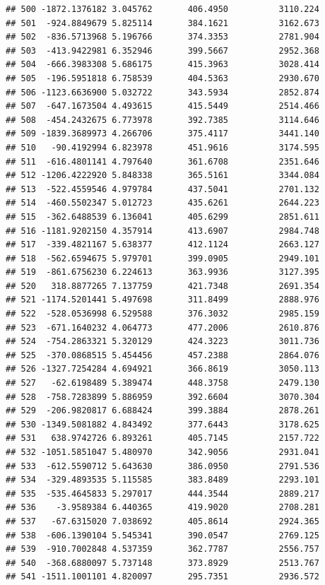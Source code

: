 \documentclass[
]{article}
\begin{document}
\begin{verbatim}
## 500 -1872.1376182 3.045762       406.4950          3110.224
## 501  -924.8849679 5.825114       384.1621          3162.673
## 502  -836.5713968 5.196766       374.3353          2781.904
## 503  -413.9422981 6.352946       399.5667          2952.368
## 504  -666.3983308 5.686175       415.3963          3028.414
## 505  -196.5951818 6.758539       404.5363          2930.670
## 506 -1123.6636900 5.032722       343.5934          2852.874
## 507  -647.1673504 4.493615       415.5449          2514.466
## 508  -454.2432675 6.773978       392.7385          3114.646
## 509 -1839.3689973 4.266706       375.4117          3441.140
## 510   -90.4192994 6.823978       451.9616          3174.595
## 511  -616.4801141 4.797640       361.6708          2351.646
## 512 -1206.4222920 5.848338       365.5161          3344.084
## 513  -522.4559546 4.979784       437.5041          2701.132
## 514  -460.5502347 5.012723       435.6261          2644.223
## 515  -362.6488539 6.136041       405.6299          2851.611
## 516 -1181.9202150 4.357914       413.6907          2984.748
## 517  -339.4821167 5.638377       412.1124          2663.127
## 518  -562.6594675 5.979701       399.0905          2949.101
## 519  -861.6756230 6.224613       363.9936          3127.395
## 520   318.8877265 7.137759       421.7348          2691.354
## 521 -1174.5201441 5.497698       311.8499          2888.976
## 522  -528.0536998 6.529588       376.3032          2985.159
## 523  -671.1640232 4.064773       477.2006          2610.876
## 524  -754.2863321 5.320129       424.3223          3011.736
## 525  -370.0868515 5.454456       457.2388          2864.076
## 526 -1327.7254284 4.694921       366.8619          3050.113
## 527   -62.6198489 5.389474       448.3758          2479.130
## 528  -758.7283899 5.886959       392.6604          3070.304
## 529  -206.9820817 6.688424       399.3884          2878.261
## 530 -1349.5081882 4.843492       377.6443          3178.625
## 531   638.9742726 6.893261       405.7145          2157.722
## 532 -1051.5851047 5.480970       342.9056          2931.041
## 533  -612.5590712 5.643630       386.0950          2791.536
## 534  -329.4893535 5.115585       383.8489          2293.101
## 535  -535.4645833 5.297017       444.3544          2889.217
## 536    -3.9589384 6.440365       419.9020          2708.281
## 537   -67.6315020 7.038692       405.8614          2924.365
## 538  -606.1390104 5.545341       390.0547          2769.125
## 539  -910.7002848 4.537359       362.7787          2556.757
## 540  -368.6880097 5.737148       373.8929          2513.767
## 541 -1511.1001101 4.820097       295.7351          2936.572

\end{verbatim}
\end{document}
